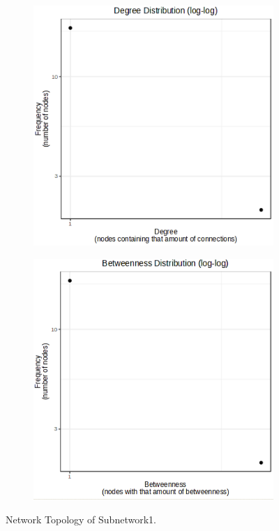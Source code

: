 \begin{figure}[H]
    \centering
    \begin{subfigure}[t]{0.48\textwidth}
        \centering
        \includegraphics[width=\textwidth]{./fig/fig4_12_1.png}
        \label{fig:subnetwork1}
    \end{subfigure}
    \hfill
    \begin{subfigure}[t]{0.48\textwidth}
        \centering
        \includegraphics[width=\textwidth]{./fig/fig4_12_2.png}
        \label{fig:subnetwork2}
    \end{subfigure}
    \caption{Network Topology of Subnetwork1. }
    \label{fig:figure4-12}
\end{figure}

